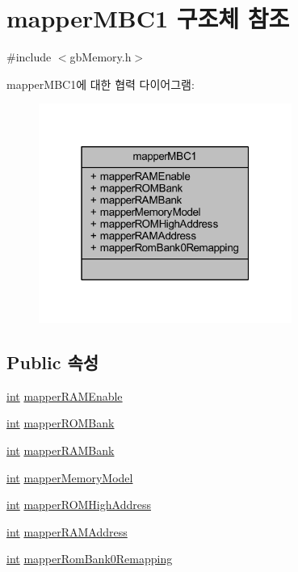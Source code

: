 \hypertarget{structmapper_m_b_c1}{}\section{mapper\+M\+B\+C1 구조체 참조}
\label{structmapper_m_b_c1}


{\ttfamily \#include $<$gb\+Memory.\+h$>$}



mapper\+M\+B\+C1에 대한 협력 다이어그램\+:\nopagebreak
\begin{figure}[H]
\begin{center}
\leavevmode
\includegraphics[width=235pt]{structmapper_m_b_c1__coll__graph}
\end{center}
\end{figure}
\subsection*{Public 속성}
\begin{DoxyCompactItemize}
\item 
\mbox{\hyperlink{_util_8cpp_a0ef32aa8672df19503a49fab2d0c8071}{int}} \mbox{\hyperlink{structmapper_m_b_c1_a444aae31d54f8f68f4d141bc21efc2a3}{mapper\+R\+A\+M\+Enable}}
\item 
\mbox{\hyperlink{_util_8cpp_a0ef32aa8672df19503a49fab2d0c8071}{int}} \mbox{\hyperlink{structmapper_m_b_c1_a4ef895e141334ea18c5f4af278b3bc76}{mapper\+R\+O\+M\+Bank}}
\item 
\mbox{\hyperlink{_util_8cpp_a0ef32aa8672df19503a49fab2d0c8071}{int}} \mbox{\hyperlink{structmapper_m_b_c1_a69513ec2d0118ee2f3b0d7e570f01f77}{mapper\+R\+A\+M\+Bank}}
\item 
\mbox{\hyperlink{_util_8cpp_a0ef32aa8672df19503a49fab2d0c8071}{int}} \mbox{\hyperlink{structmapper_m_b_c1_a935a1164b520c174208742d6b530eef7}{mapper\+Memory\+Model}}
\item 
\mbox{\hyperlink{_util_8cpp_a0ef32aa8672df19503a49fab2d0c8071}{int}} \mbox{\hyperlink{structmapper_m_b_c1_a3f67a98b1f2e81822fb700afeb9cbbe6}{mapper\+R\+O\+M\+High\+Address}}
\item 
\mbox{\hyperlink{_util_8cpp_a0ef32aa8672df19503a49fab2d0c8071}{int}} \mbox{\hyperlink{structmapper_m_b_c1_a6dcbb2f1cdcd7b0345786002921bfae9}{mapper\+R\+A\+M\+Address}}
\item 
\mbox{\hyperlink{_util_8cpp_a0ef32aa8672df19503a49fab2d0c8071}{int}} \mbox{\hyperlink{structmapper_m_b_c1_a617ace83f58c31fcc09c685ad8cabb40}{mapper\+Rom\+Bank0\+Remapping}}
\end{DoxyCompactItemize}


